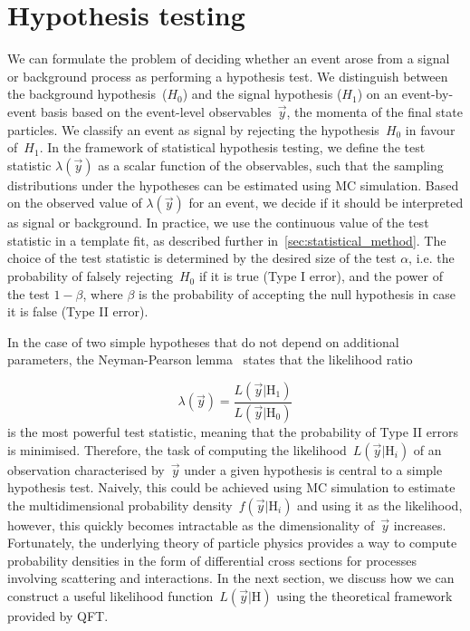 \section{Hypothesis testing}
\label{sec:test_statistic}
We can formulate the problem of deciding whether an event arose from a signal or background process as performing a hypothesis test. We distinguish between the background hypothesis~($H_0$) and the signal hypothesis ($H_1$) on an event-by-event basis based on the event-level observables~$\vec{y}$, the momenta of the final state particles. We classify an event as signal by rejecting the hypothesis~$H_0$ in favour of~$H_1$. In the framework of statistical hypothesis testing, we define the test statistic $\lambda(\vec{y})$ as a scalar function of the observables, such that the sampling distributions under the hypotheses can be estimated using MC simulation. Based on the observed value of $\lambda(\vec{y})$ for an event, we decide if it should be interpreted as signal or background. In practice, we use the continuous value of the test statistic in a template fit, as described further in~\cref{sec:statistical_method}. The choice of the test statistic is determined by the desired size of the test $\alpha$, i.e. the probability of falsely rejecting~$H_0$ if it is true (Type I error), and the power of the test $1 - \beta$, where $\beta$ is the probability of accepting the null hypothesis in case it is false (Type II error).

In the case of two simple hypotheses that do not depend on additional parameters, the Neyman-Pearson lemma~\cite{neyman1992problem} states that the likelihood ratio

\begin{equation}
\lambda(\vec{y}) = \frac{L(\vec{y}|\mathrm{H}_1)}{L(\vec{y}|\mathrm{H}_0)}
\end{equation}
is the most powerful test statistic, meaning that the probability of Type II errors is minimised. Therefore, the task of computing the likelihood~$L(\vec{y}|\mathrm{H}_i)$ of an observation characterised by~$\vec{y}$ under a given hypothesis is central to a simple hypothesis test. Naively, this could be achieved using MC simulation to estimate the multidimensional probability density~$f(\vec{y}|\mathrm{H}_i)$ and using it as the likelihood, however, this quickly becomes intractable as the dimensionality of~$\vec{y}$ increases. Fortunately, the underlying theory of particle physics provides a way to compute probability densities in the form of differential cross sections for processes involving scattering and interactions. In the next section, we discuss how we can construct a useful likelihood function~$L(\vec{y}|\mathrm{H})$ using the theoretical framework provided by QFT.

